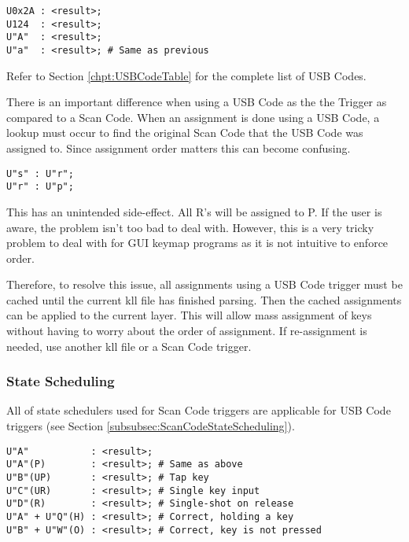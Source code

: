 \documentclass{kiibohd-template}
\begin{document}
\begin{lstlisting}
U0x2A : <result>;
U124  : <result>;
U"A"  : <result>;
U"a"  : <result>; # Same as previous
\end{lstlisting}

Refer to Section \ref{chpt:USBCodeTable} for the complete list of USB Codes.

There is an important difference when using a USB Code as the the Trigger as compared to a Scan Code.
When an assignment is done using a USB Code, a lookup must occur to find the original Scan Code that the USB Code was assigned to.
Since assignment order matters this can become confusing.

\begin{lstlisting}
U"s" : U"r";
U"r" : U"p";
\end{lstlisting}

This has an unintended side-effect.
All R's will be assigned to P.
If the user is aware, the problem isn't too bad to deal with.
However, this is a very tricky problem to deal with for GUI keymap programs as it is not intuitive to enforce order.

Therefore, to resolve this issue, all assignments using a USB Code trigger must be cached until the current kll file has finished parsing.
Then the cached assignments can be applied to the current layer.
This will allow mass assignment of keys without having to worry about the order of assignment.
If re-assignment is needed, use another kll file or a Scan Code trigger.


\subsubsection{State Scheduling}
\label{subsubsec:trigusbstateschedule}

All of state schedulers used for Scan Code triggers are applicable for USB Code triggers (see Section \ref{subsubsec:ScanCodeStateScheduling}).

\begin{lstlisting}
U"A"           : <result>;
U"A"(P)        : <result>; # Same as above
U"B"(UP)       : <result>; # Tap key
U"C"(UR)       : <result>; # Single key input
U"D"(R)        : <result>; # Single-shot on release
U"A" + U"Q"(H) : <result>; # Correct, holding a key
U"B" + U"W"(O) : <result>; # Correct, key is not pressed
\end{lstlisting}


\end{document}
